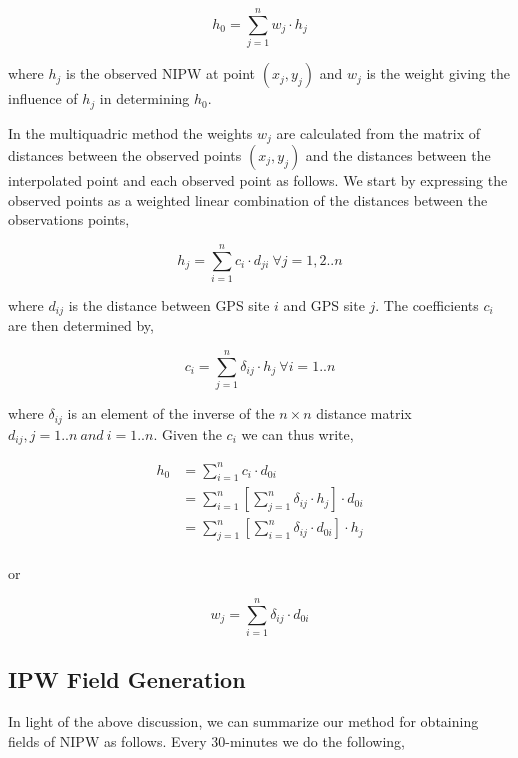 \documentclass[proposal]{umassthesis}
\begin{document}
{\begin{equation}
h_0 = \sum_{j=1}^{n} w_j \cdot h_j
\end{equation}

where $h_j$ is the observed NIPW at point $(x_j,y_j)$ and $w_j$ is the weight giving the influence of $h_j$ in determining $h_0$.

In the multiquadric method the weights $w_j$ are calculated from the matrix of distances between the observed points $(x_j,y_j)$ and the distances between the interpolated point and each observed point as follows. We start by expressing the observed points as a weighted linear combination of the distances between the observations points,

\begin{equation}
h_j = \sum_{i=1}^{n} c_i \cdot d_{ji} \ \forall j = 1,2..n
\end{equation}

where $d_{ij}$ is the distance between GPS site $i$ and GPS site $j$. The coefficients $c_i$ are then determined by,

\begin{equation}
c_i = \sum_{j=1}^{n} \delta_{ij} \cdot h_j \ \forall i = 1..n
\end{equation}

where $\delta_{ij}$ is an element of the inverse of the $n \times n$ distance matrix $d_{ij}, j = 1..n \ and \ i = 1..n$. Given the $c_i$ we can thus write,

\begin{equation}
\begin{align*}
h_0 &= \sum_{i=1}^n c_i \cdot d_{0i} \\
&= \sum_{i=1}^n [ \sum_{j=1}^n \delta_{ij} \cdot h_j ] \cdot d_{0i} \\
&= \sum_{j=1}^n [ \sum_{i=1}^n \delta_{ij} \cdot d_{0i} ] \cdot h_j \\
\end{align*}
\end{equation}

or

\begin{equation}
w_j = \sum_{i=1}^n \delta_{ij} \cdot d_{0i}
\end{equation}

\subsection{IPW Field Generation}

In light of the above discussion, we can summarize our method for obtaining fields of NIPW as follows. Every 30-minutes we do the following,

}
\end{document}
